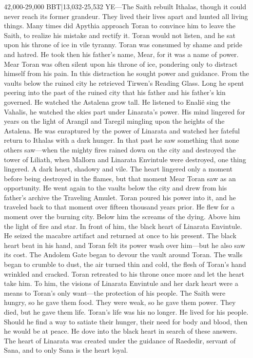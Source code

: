 \documentclass[smalldemyvopaper,11pt,twoside,onecolumn,openright,extrafontsizes]{memoir}
\begin{document}
{{42,000-29,000 BBT|13,032-25,532 YE—The Saith rebuilt Ithalas, though it could never reach its former grandeur. They lived their lives apart and hunted all living things. Many times did Apythia approach Toran to convince him to leave the Saith, to realize his mistake and rectify it. Toran would not listen, and he sat upon his throne of ice in vile tyranny. Toran was consumed by shame and pride and hatred. He took then his father’s name, Mear, for it was a name of power. Mear Toran was often silent upon his throne of ice, pondering only to distract himself from his pain. In this distraction he sought power and guidance. From the vaults below the ruined city he retrieved Tirwen’s Reading Glass. Long he spent peering into the past of the ruined city that his father and his father’s kin governed. He watched the Astalena grow tall. He listened to Enalië sing the Vahalis, he watched the skies part under Linarata’s power. His mind lingered for years on the light of Arangil and Taregil mingling upon the heights of the Astalena. He was enraptured by the power of Linarata and watched her fateful return to Ithalas with a dark hunger. In that past he saw something that none others saw—when the mighty fires rained down on the city and destroyed the tower of Liliath, when Mallorn and Linarata Envintule were destroyed, one thing lingered. A dark heart, shadowy and vile. The heart lingered only a moment before being destroyed in the flames, but that moment Mear Toran saw as an opportunity. He went again to the vaults below the city and drew from his father’s archive the Traveling Amulet. Toran poured his power into it, and he traveled back to that moment over fifteen thousand years prior. He flew for a moment over the burning city. Below him the screams of the dying. Above him the light of fire and star. In front of him, the black heart of Linarata Envintule. He seized the macabre artifact and returned at once to his present. The black heart beat in his hand, and Toran felt its power wash over him—but he also saw its cost. The Andolem Gate began to devour the vault around Toran. The walls began to crumble to dust, the air turned thin and cold, the flesh of Toran’s hand wrinkled and cracked. Toran retreated to his throne once more and let the heart take him. To him, the visions of Linarata Envintule and her dark heart were a means to Toran’s only want—the protection of his people. The Saith were hungry, so he gave them food. They were weak, so he gave them power. They died, but he gave them life. Toran’s life was his no longer. He lived for his people. Should he find a way to satiate their hunger, their need for body and blood, then he would be at peace. He dove into the black heart in search of these answers.
	The heart of Linarata was created under the guidance of Raededir, servant of Sana, and to only Sana is the heart loyal. 


}}
\end{document}
